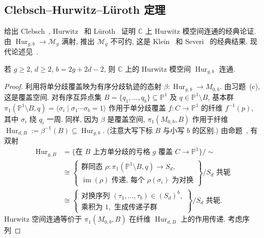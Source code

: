 \subsection{Clebsch--Hurwitz--Lüroth 定理}\label{src:6.7.3-subsection}
给出 Clebsch~\cite{Cle73}, Hurwitz~\cite{Hur91} 和 Lüroth~\cite{Lür71} 证明 $\mathbb C$ 上 Hurwitz 模空间连通的经典论证. 由 $\operatorname{Hur}_{g,\allowbreak b}\to\mathcal M_g$ 满射, 推出 $\mathcal M_g$ 不可约, 这是 Klein~\cite[\S19]{Kle82} 和 Severi~\cite[\S F]{Sev21} 的经典结果. 现代论述见~\cite[命题 1.5]{Ful69}.
\begin{theorem}\label{src:6.7.19}
若 $g\geq2$, $d\geq2$, $b=2g+2d-2$, 则 $\mathbb C$ 上的 Hurwitz 模空间 $\operatorname{Hur}_{g,\allowbreak b}$ 连通.
\end{theorem}
\begin{proof}
利用将单分歧覆盖映为有序分歧轨迹的态射 $\beta:\operatorname{Hur}_{g,\allowbreak b}\to\allowbreak M_{0,\allowbreak b}$. 由习题~(c), 这是覆盖空间. 对有序互异点集 $B=\{q_1,\allowbreak \ldots,\allowbreak q_b\}\subseteq\mathbb P^1$ 及 $q\in\mathbb P^1\setminus B$, 基本群 $\pi_1(\mathbb P^1\setminus B,\allowbreak q)=\langle\sigma_i\mid\sigma_1\cdots\sigma_b=1\rangle$ 作用于单分歧覆盖 $f:C\to\mathbb P^1$ 的纤维 $f^{-1}(p)$, 其中 $\sigma_i$ 绕 $q_i$ 一周. 同样, 因为 $\beta$ 是覆盖空间, $\pi_1(M_{0,\allowbreak b},\allowbreak B)$ 作用于纤维 $\operatorname{Hur}_{d,\allowbreak B}:=\beta^{-1}(B)\subseteq\operatorname{Hur}_{g,\allowbreak b}$. (注意大写下标 $B$ 与小写 $b$ 的区别.) 由命题~, 有双射
\[
\begin{aligned}
\operatorname{Hur}_{g,B}
&=\{\text{在 }B\text{ 上方单分歧的亏格 }g\text{ 覆盖 }C\to\mathbb P^1\}/{\sim}\\
&\cong\left\{\begin{array}{l}\text{群同态 }\rho:\pi_1(\mathbb P^1\setminus B,q)\to S_d,\\\operatorname{im}(\rho)\text{ 传递, 每个 }\rho(\sigma_i)\text{ 为对换}\end{array}\right\}/S_d\text{ 共轭}\\
&\cong\left\{\begin{array}{l}\text{对换序列 }(\tau_1,\ldots,\tau_b)\in(S_d)^b,\\\text{乘积为 }1,\text{ 生成传递子群}\end{array}\right\}/S_d\text{ 共轭}.
\end{aligned}
\]
Hurwitz 空间连通等价于 $\pi_1(M_{0,\allowbreak b},\allowbreak B)$ 在纤维 $\operatorname{Hur}_{d,\allowbreak B}$ 上的作用传递. 考虑序列

\end{proof}
